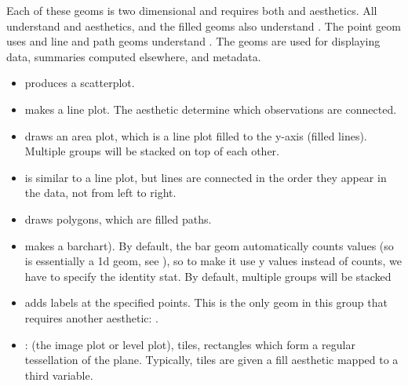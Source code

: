 Each of these geoms is two dimensional and requires both  and  aesthetics.  All understand  and  aesthetics, and the filled geoms also understand .  The point geom uses  and line and path geoms understand . The geoms are used for displaying data, summaries computed elsewhere, and metadata.

\begin{itemize}
  \item {} produces a scatterplot.

  \item {} makes a line plot.  The  aesthetic determine which observations are connected.

  \item {} draws an area plot, which is a line plot filled to the y-axis (filled lines).  Multiple groups will be stacked on top of each other.

  \item {} is similar to a line plot, but lines are connected in the order they appear in the data, not from left to right.  

  \item {} draws polygons, which are filled paths.

  \item {} makes a barchart).  By default, the bar geom automatically counts values (so is essentially a 1d geom, see ), so to make it use y values instead of counts, we have to specify the identity stat.  By default, multiple groups will be stacked 

  \item {} adds labels at the specified points.  This is the only geom in this group that requires another aesthetic: .

  \item {}: (the image plot or level plot), tiles, rectangles which form a regular tessellation of the plane.  Typically, tiles are given a fill aesthetic mapped to a third variable.
\end{itemize}

